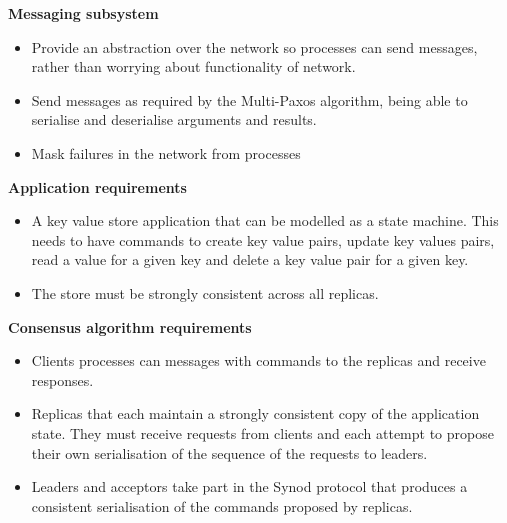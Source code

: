 \textbf{Messaging subsystem}
\begin{itemize}
  \item Provide an abstraction over the network so processes can send messages, rather than worrying about functionality of network.
  \item Send messages as required by the Multi-Paxos algorithm, being able to serialise and deserialise arguments and results.
  \item Mask failures in the network from processes
\end{itemize}

\textbf{Application requirements}
\begin{itemize}
  \item A key value store application that can be modelled as a state machine. This needs to have commands to create key value pairs, update key values pairs, read a value for a given key and delete a key value pair for a given key.
  \item The store must be strongly consistent across all replicas.
\end{itemize}

\textbf{Consensus algorithm requirements}
\begin{itemize}
  \item Clients processes can messages with commands to the replicas and receive responses.
  \item Replicas that each maintain a strongly consistent copy of the application state. They must receive requests from clients and each attempt to propose their own serialisation of the sequence of the requests to leaders.
  \item Leaders and acceptors take part in the Synod protocol that produces a consistent serialisation of the commands proposed by replicas.
\end{itemize}

%
%
%

